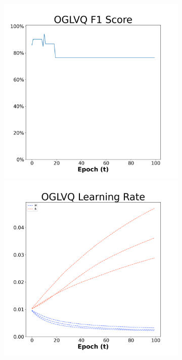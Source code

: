 \begin{figure}[H]
    \centering %
\begin{subfigure}{0.3\textwidth}
  \includegraphics[width=\linewidth]{images/exper2/Sonar/OGLVQ_0.01_f1.png}
    \includegraphics[width=\linewidth]{images/exper2/Sonar/OGLVQ_0.01_lr.png}

\end{subfigure}
\end{figure}
